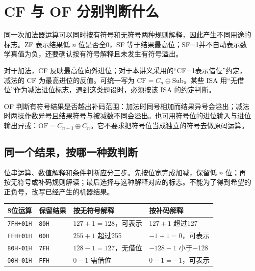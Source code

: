 \section{CF 与 OF 分别判断什么}\label{CO02-11}

同一次加法器运算可以同时按有符号和无符号两种规则解释，因此产生不同用途的标志。ZF 表示结果低 \(n\) 位是否全0，SF 等于结果最高位；SF=1并不自动表示数学真值为负，还要确认按有符号解释且未发生有符号溢出。

对于加法，CF 反映最高位向外进位；对于本讲义采用的``CF=1表示借位''约定，减法的 CF 为最高进位的反值。可统一写为 \(\mathrm{CF}=C_n\oplus\mathrm{Sub}\)。某些 ISA 用``无借位''作为减法进位标志，遇到这类题设时，必须按该 ISA 的约定判断。

OF 判断有符号结果是否越出补码范围：加法时同号相加而结果异号会溢出；减法时两操作数异号且结果符号与被减数不同会溢出。也可用符号位的进位输入与进位输出异或：\(\mathrm{OF}=C_{n-1}\oplus C_n\)。它不要求把符号位当成独立的符号去做原码运算。

\subsection{同一个结果，按哪一种数判断}\label{CO02-12}

位串运算、数值解释和条件判断应分三步。先按位宽完成加减，保留低 \(n\) 位；再按无符号或补码规则解读；最后选择与这种解释对应的标志。不能为了得到希望的正负号，改写已经产生的机器结果。

\begin{wideblock}\par\medskip\noindent\begin{minipage}{\linewidth}\fontsize{9.3}{12}\selectfont\begin{tabularx}{\linewidth}{@{}YYYY@{}}
\toprule\noalign{}
8位运算 & 保留结果 & 按无符号解释 & 按补码解释 \\
\midrule\noalign{}


\texttt{7FH+\allowbreak{}01H} & \texttt{80H} & \(127+1=128\)，可表示 & \(127+1\) 超过127 \\
\texttt{FFH+\allowbreak{}01H} & \texttt{00H} & \(255+1\) 超过255 & \(-1+1=0\)，可表示 \\
\texttt{80H-01H} & \texttt{7FH} & \(128-1=127\)，无借位 & \(-128-1\) 小于\ensuremath{-}128 \\
\texttt{00H-01H} & \texttt{FFH} & \(0-1\) 需借位 & \(0-1=-1\)，可表示 \\
\bottomrule\end{tabularx}
\end{minipage}\par\medskip\end{wideblock}

